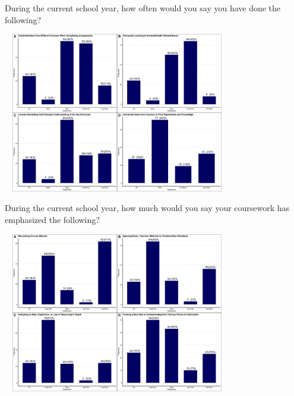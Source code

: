 \documentclass{beamer}
\begin{document}
	\begin{frame}{During the current school year, how often would you say you have done the following?}
		
		\begin{center}
			\includegraphics[width=10cm, height=7cm]{figures/how_often_haveyou_done_thefollowing.jpg}
		\end{center}
		
	\end{frame}

	\begin{frame}{During the current school year, how much would you say your coursework has emphasized the following? }
		
		\begin{center}
			\includegraphics[width=10cm, height=7cm]{figures/howmuch_coursework_emphasized_thefollowing.jpg}
		\end{center}
		
	\end{frame}
\end{document}
